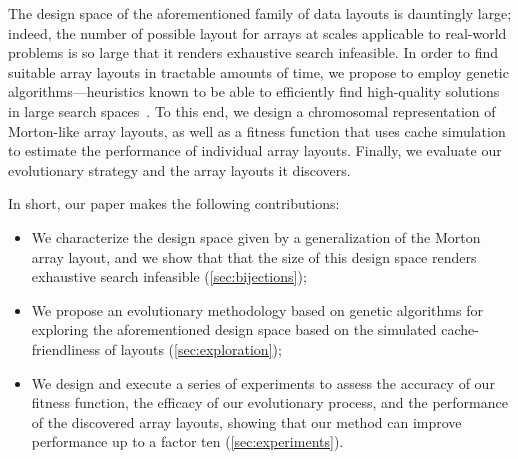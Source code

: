 The design space of the aforementioned family of data layouts is dauntingly large; indeed, the number of possible layout for arrays at scales applicable to real-world problems is so large that it renders exhaustive search infeasible. In order to find suitable array layouts in tractable amounts of time, we propose to employ genetic algorithms---heuristics known to be able to efficiently find high-quality solutions in large search spaces~\cite{holland1992genetic}. To this end, we design a chromosomal representation of Morton-like array layouts, as well as a fitness function that uses cache simulation to estimate the performance of individual array layouts. Finally, we evaluate our evolutionary strategy and the array layouts it discovers.

In short, our paper makes the following contributions:

\begin{itemize}
    \item We characterize the design space given by a generalization of the Morton array layout, and we show that that the size of this design space renders exhaustive search infeasible (\cref{sec:bijections});
    \item We propose an evolutionary methodology based on genetic algorithms for exploring the aforementioned design space based on the simulated cache-friendliness of layouts (\cref{sec:exploration});
    \item We design and execute a series of experiments to assess the accuracy of our fitness function, the efficacy of our evolutionary process, and the performance of the discovered array layouts, showing that our method can improve performance up to a factor ten (\cref{sec:experiments}).
\end{itemize}
